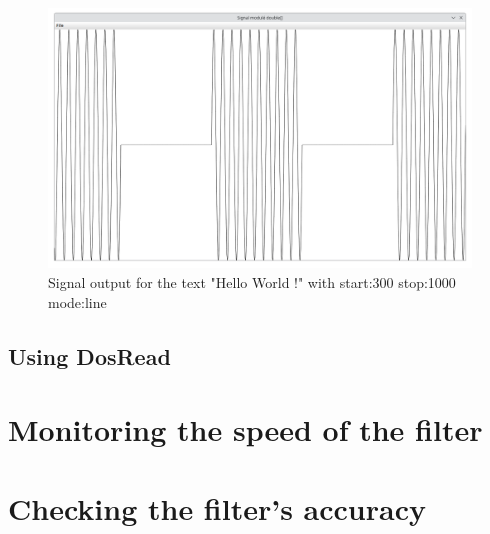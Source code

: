 \begin{figure}[!h]
	\begin{center}
		\includegraphics[width=15cm]{images/StdDraw1.png}
	\end{center}
	\caption{Signal output for the text "Hello World !" with start:300 stop:1000 mode:line}
\end{figure}

\subsection{Using DosRead}

\section{Monitoring the speed of the filter}

\section{Checking the filter's accuracy}